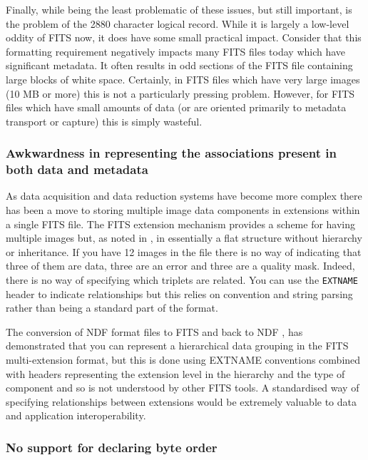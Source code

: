 \documentclass[final,authoryear,5p,times,twocolumn]{elsarticle}
\begin{document}
{{Finally, while being the least problematic of these issues, but still
important, is the problem of the 2880 character logical record. While
it is largely a low-level oddity of FITS now, it does have some small
practical impact. Consider that this formatting requirement negatively
impacts many FITS files today which have significant metadata. It
often results in odd sections of the FITS file containing large blocks
of white space. Certainly, in FITS files which have very large images
(10 MB or more) this is not a particularly pressing
problem. However, for FITS files which have small amounts of data (or
are oriented primarily to metadata transport or capture) this is
simply wasteful.


\subsubsection{Awkwardness in representing the associations present in both data and metadata}


As data acquisition and data reduction systems have become more
complex there has been a move to storing multiple image data
components in extensions within a single FITS file. The FITS extension
mechanism provides a scheme for having multiple images but, as noted
in \citet{2003ASSL..285...71G}, in essentially a flat structure
without hierarchy or inheritance. If you have 12 images in the file
there is no way of indicating that three of them are data, three are an error
and three are a quality mask. Indeed, there is no way of specifying which
triplets are related. You can use the \texttt{EXTNAME} header to
indicate relationships but this relies on convention and string
parsing rather than being a standard part of the format.


The conversion of NDF format files to FITS and back to NDF
\citep{SUN55,1997STARB..19...14C}, has demonstrated that you can
represent a hierarchical data grouping in the FITS multi-extension
format, but this is done using EXTNAME conventions combined with
headers representing the extension level in the hierarchy and the type
of component and so is not understood by other FITS tools. A
standardised way of specifying relationships between extensions would
be extremely valuable to data and application interoperability.


\subsubsection{No support for declaring byte order}


}}
\end{document}
